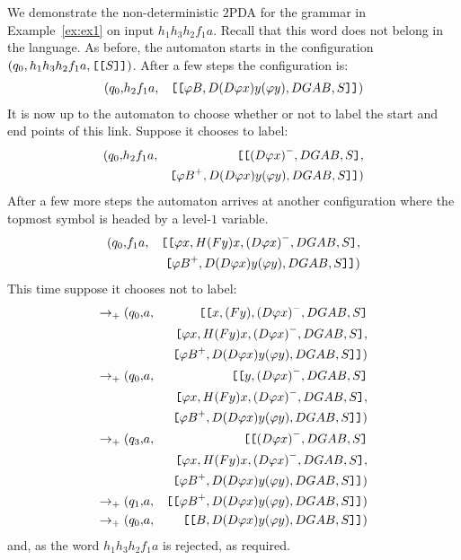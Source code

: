 \begin{example}
We demonstrate the non-deterministic $2$PDA for the grammar in
Example~\ref{ex:ex1} on input $h_1h_3h_2f_1a$. Recall that this word
does not belong in the language. As before, the automaton starts in the configuration $(q_0, h_1h_3h_2f_1a,
\hbox{\tt [}{\hbox{\tt [}{S}\hbox{\tt ]}}\hbox{\tt ]})$. After a few steps the configuration is:
\begin{eqnarray}
\nonumber (q_0, & h_2f_1a, & \hbox{\tt [}{\hbox{\tt [}{\varphi B, D(D
\varphi x) y (\varphi y), DGAB,S}\hbox{\tt ]}}\hbox{\tt ]})
\end{eqnarray}
It is now up to the automaton to choose whether or not to label the
start and end points of this link. Suppose it chooses to label:
\begin{eqnarray}
\nonumber (q_0, & h_2f_1a, & \hbox{\tt [}\hbox{\tt [}{{(D \varphi x)}^{-}, DGAB, S}\hbox{\tt ]},\\
\nonumber & & \hbox{\tt [}{{\varphi B}^{+}, D (D \varphi x) y (\varphi
y), DGAB,S}\hbox{\tt ]}\hbox{\tt ]})
\end{eqnarray}
After a few more steps the automaton arrives at another
configuration where the topmost symbol is headed by a level-$1$
variable.
\begin{eqnarray}
\nonumber (q_0, & f_1a, & \hbox{\tt [}\hbox{\tt [}{\varphi x,H (F y) x,{(D
\varphi x)}^{-}, DGAB, S}\hbox{\tt ]}, \\
\nonumber & &\hbox{\tt [}{{\varphi B}^{+}, D (D \varphi x) y (\varphi
y), DGAB,S}\hbox{\tt ]}\hbox{\tt ]})
\end{eqnarray}
This time suppose it chooses not to label:
\begin{eqnarray}
\nonumber \rightarrow_+ (q_0, & a, & \hbox{\tt [}\hbox{\tt [}{x,(F y),{(D \varphi x)}^{-}, DGAB, S}\hbox{\tt ]}\\
\nonumber & &\hbox{\tt [}{\varphi x,H (F y) x,{(D \varphi x)}^{-}, DGAB, S}\hbox{\tt ]}, \\
\nonumber & &\hbox{\tt [}{{\varphi B}^{+}, D (D \varphi x) y (\varphi
y), DGAB,S}\hbox{\tt ]}\hbox{\tt ]})\\
\nonumber \rightarrow_+ (q_0, & a, & \hbox{\tt [}\hbox{\tt [}{y,{(D \varphi x)}^{-}, DGAB, S}\hbox{\tt ]}\\
\nonumber & &\hbox{\tt [}{\varphi x,H (F y) x,{(D \varphi x)}^{-}, DGAB, S}\hbox{\tt ]}, \\
\nonumber & &\hbox{\tt [}{{\varphi B}^{+}, D (D \varphi x) y (\varphi
y), DGAB,S}\hbox{\tt ]}\hbox{\tt ]})\\
\nonumber \rightarrow_+ (q_3, & a, & \hbox{\tt [}\hbox{\tt [}{{(D \varphi x)}^{-}, DGAB, S}\hbox{\tt ]}\\
\nonumber & &\hbox{\tt [}{\varphi x,H (F y) x,{(D \varphi x)}^{-}, DGAB, S}\hbox{\tt ]}, \\
\nonumber & &\hbox{\tt [}{{\varphi B}^{+}, D (D \varphi x) y (\varphi
y), DGAB,S}\hbox{\tt ]}\hbox{\tt ]})\\
\nonumber \rightarrow_+ (q_1, & a, & \hbox{\tt [}\hbox{\tt [}{{\varphi
B}^{+}, D (D \varphi x) y (\varphi
y), DGAB,S}\hbox{\tt ]}\hbox{\tt ]})\\
\nonumber \rightarrow_+ (q_0, & a, & \hbox{\tt [}\hbox{\tt [}{B, D (D
\varphi x) y (\varphi y), DGAB,S}\hbox{\tt ]}\hbox{\tt ]})
\end{eqnarray}
and, as the word $h_1h_3h_2f_1a$ is rejected, as required.
\end{example}

